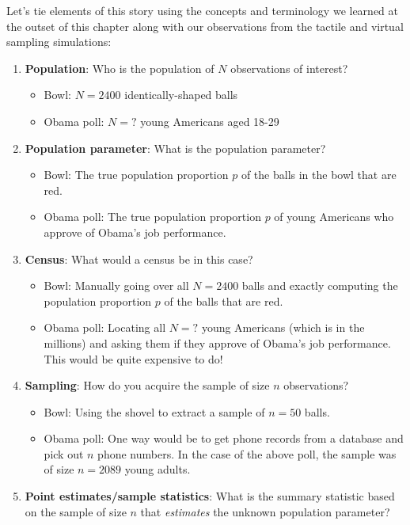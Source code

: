 \documentclass[12pt,]{krantz}
\providecommand{\tightlist}{%
  \setlength{\itemsep}{0pt}\setlength{\parskip}{0pt}}
\begin{document}
Let's tie elements of this story using the concepts and terminology we
learned at the outset of this chapter along with our observations from
the tactile and virtual sampling simulations:

\begin{enumerate}
\def\labelenumi{\arabic{enumi}.}
\tightlist
\item
  \textbf{Population}: Who is the population of \(N\) observations of
  interest?

  \begin{itemize}
  \tightlist
  \item
    Bowl: \(N=2400\) identically-shaped balls
  \item
    Obama poll: \(N = \text{?}\) young Americans aged 18-29
  \end{itemize}
\item
  \textbf{Population parameter}: What is the population parameter?

  \begin{itemize}
  \tightlist
  \item
    Bowl: The true population proportion \(p\) of the balls in the bowl
    that are red.
  \item
    Obama poll: The true population proportion \(p\) of young Americans
    who approve of Obama's job performance.
  \end{itemize}
\item
  \textbf{Census}: What would a census be in this case?

  \begin{itemize}
  \tightlist
  \item
    Bowl: Manually going over all \(N=2400\) balls and exactly computing
    the population proportion \(p\) of the balls that are red.
  \item
    Obama poll: Locating all \(N = \text{?}\) young Americans (which is
    in the millions) and asking them if they approve of Obama's job
    performance. This would be quite expensive to do!
  \end{itemize}
\item
  \textbf{Sampling}: How do you acquire the sample of size \(n\)
  observations?

  \begin{itemize}
  \tightlist
  \item
    Bowl: Using the shovel to extract a sample of \(n=50\) balls.
  \item
    Obama poll: One way would be to get phone records from a database
    and pick out \(n\) phone numbers. In the case of the above poll, the
    sample was of size \(n=2089\) young adults.
  \end{itemize}
\item
  \textbf{Point estimates/sample statistics}: What is the summary
  statistic based on the sample of size \(n\) that \emph{estimates} the
  unknown population parameter?


\end{enumerate}
\end{document}
